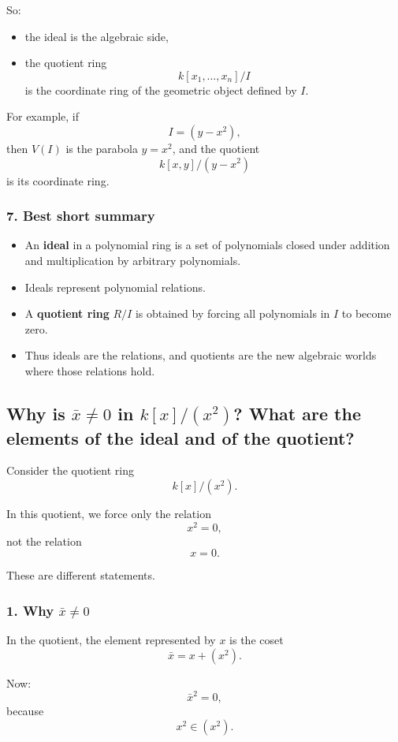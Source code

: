 \documentclass[12pt,a4paper]{article}
\theoremstyle{plain}
\theoremstyle{definition}      %
\begin{document}
	So:
	\begin{itemize}
		\item the ideal is the algebraic side,
		\item the quotient ring
		\[
		k[x_1,\dots,x_n]/I
		\]
		is the coordinate ring of the geometric object defined by \(I\).
	\end{itemize}
	
	For example, if
	\[
	I=(y-x^2),
	\]
	then \(V(I)\) is the parabola \(y=x^2\), and the quotient
	\[
	k[x,y]/(y-x^2)
	\]
	is its coordinate ring.
	
	\subsubsection*{7. Best short summary}
	
	\begin{itemize}
		\item An \textbf{ideal} in a polynomial ring is a set of polynomials closed under addition and multiplication by arbitrary polynomials.
		\item Ideals represent polynomial relations.
		\item A \textbf{quotient ring} \(R/I\) is obtained by forcing all polynomials in \(I\) to become zero.
		\item Thus ideals are the relations, and quotients are the new algebraic worlds where those relations hold.
	\end{itemize}
	
	\subsection*{Why is \(\bar x\neq 0\) in \(k[x]/(x^2)\)? What are the elements of the ideal and of the quotient?}
	
	Consider the quotient ring
	\[
	k[x]/(x^2).
	\]
	
	In this quotient, we force only the relation
	\[
	x^2=0,
	\]
	not the relation
	\[
	x=0.
	\]
	
	These are different statements.
	
	\subsubsection*{1. Why \(\bar x\neq 0\)}
	
	In the quotient, the element represented by \(x\) is the coset
	\[
	\bar x = x+(x^2).
	\]
	
	Now:
	\[
	\bar x^2=0,
	\]
	because
	\[
	x^2\in (x^2).
	\]
	
\end{document}
